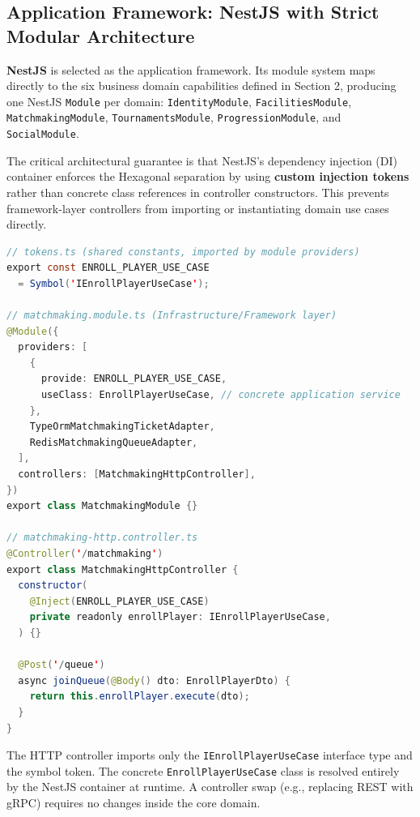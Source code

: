 \documentclass[11pt,a4paper]{report}
\begin{document}
\subsection{Application Framework: NestJS with Strict Modular Architecture}

\textbf{NestJS} is selected as the application framework. Its module system maps directly to the six business domain capabilities defined in Section 2, producing one NestJS \texttt{Module} per domain: \texttt{IdentityModule}, \texttt{FacilitiesModule}, \texttt{MatchmakingModule}, \texttt{TournamentsModule}, \texttt{ProgressionModule}, and \texttt{SocialModule}.

The critical architectural guarantee is that NestJS's dependency injection (DI) container enforces the Hexagonal separation by using \textbf{custom injection tokens} rather than concrete class references in controller constructors. This prevents framework-layer controllers from importing or instantiating domain use cases directly.

\begin{lstlisting}[language=Java, caption={NestJS Hexagonal DI Token Pattern}]
// tokens.ts (shared constants, imported by module providers)
export const ENROLL_PLAYER_USE_CASE
  = Symbol('IEnrollPlayerUseCase');

// matchmaking.module.ts (Infrastructure/Framework layer)
@Module({
  providers: [
    {
      provide: ENROLL_PLAYER_USE_CASE,
      useClass: EnrollPlayerUseCase, // concrete application service
    },
    TypeOrmMatchmakingTicketAdapter,
    RedisMatchmakingQueueAdapter,
  ],
  controllers: [MatchmakingHttpController],
})
export class MatchmakingModule {}

// matchmaking-http.controller.ts
@Controller('/matchmaking')
export class MatchmakingHttpController {
  constructor(
    @Inject(ENROLL_PLAYER_USE_CASE)
    private readonly enrollPlayer: IEnrollPlayerUseCase,
  ) {}

  @Post('/queue')
  async joinQueue(@Body() dto: EnrollPlayerDto) {
    return this.enrollPlayer.execute(dto);
  }
}
\end{lstlisting}

The HTTP controller imports only the \texttt{IEnrollPlayerUseCase} interface type and the symbol token. The concrete \texttt{EnrollPlayerUseCase} class is resolved entirely by the NestJS container at runtime. A controller swap (e.g., replacing REST with gRPC) requires no changes inside the core domain.

\end{document}
